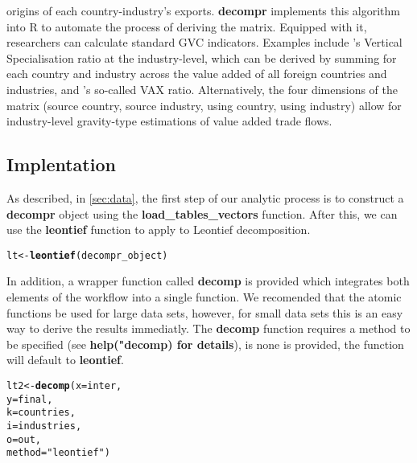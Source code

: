\documentclass[a4paper]{article}\usepackage[]{graphicx}\usepackage[]{color}
\makeatletter
\newcommand{\hlstr}[1]{\textcolor[rgb]{0.192,0.494,0.8}{#1}}%
\newcommand{\hlstd}[1]{\textcolor[rgb]{0.345,0.345,0.345}{#1}}%
\newcommand{\hlkwb}[1]{\textcolor[rgb]{0.69,0.353,0.396}{#1}}%
\newcommand{\hlkwc}[1]{\textcolor[rgb]{0.333,0.667,0.333}{#1}}%
\newcommand{\hlkwd}[1]{\textcolor[rgb]{0.737,0.353,0.396}{\textbf{#1}}}%
\newenvironment{kframe}{%
 \def\at@end@of@kframe{}%
 \ifinner\ifhmode%
  \def\at@end@of@kframe{\end{minipage}}%
  \begin{minipage}{\columnwidth}%
 \fi\fi%
 \def\FrameCommand##1{\hskip\@totalleftmargin \hskip-\fboxsep
 \colorbox{shadecolor}{##1}\hskip-\fboxsep
     \hskip-\linewidth \hskip-\@totalleftmargin \hskip\columnwidth}%
 \MakeFramed {\advance\hsize-\width
   \@totalleftmargin\z@ \linewidth\hsize
   \@setminipage}}%
 {\par\unskip\endMakeFramed%
 \at@end@of@kframe}
\newenvironment{knitrout}{}{} %
\makeatother
\begin{document}
origins of each country-industry's exports.
\textbf{decompr} implements this algorithm into R to automate the process of deriving the matrix. 
Equipped with it, researchers can calculate standard GVC indicators.
Examples include \citet{dahuetal01}'s Vertical Specialisation ratio at the industry-level, 
which can be derived by summing for each country and industry across the value added of all foreign countries and industries,
and \citet{rojoguno12}'s so-called VAX ratio.
Alternatively, the four dimensions of the matrix (source country, source industry, using country, using industry) allow for industry-level gravity-type estimations of value added trade flows.

\subsection{Implentation}
As described, in \cref{sec:data}, the first step of our analytic process is to construct a \textbf{decompr} object using the \textbf{load\_tables\_vectors} function. After this, we can use the \textbf{leontief} function to apply to Leontief decomposition.
\begin{knitrout}
\color{fgcolor}\begin{kframe}
\begin{alltt}
\hlstd{lt} \hlkwb{<-} \hlkwd{leontief}\hlstd{( decompr_object )}
\end{alltt}
\end{kframe}
\end{knitrout}

In addition, a wrapper function called \textbf{decomp} is provided which integrates both elements of the workflow into a single function.
We recomended that the atomic functions be used for large data sets, however, for small data sets this is an easy way to derive the results immediatly.
The \textbf{decomp} function requires a method to be specified (see \textbf{help("decomp) for details}), is none is provided, the function will default to \textbf{leontief}.

\begin{knitrout}
\color{fgcolor}\begin{kframe}
\begin{alltt}
\hlstd{lt2} \hlkwb{<-} \hlkwd{decomp}\hlstd{(} \hlkwc{x} \hlstd{= inter,}
               \hlkwc{y} \hlstd{= final,}
               \hlkwc{k} \hlstd{= countries,}
               \hlkwc{i} \hlstd{= industries,}
               \hlkwc{o} \hlstd{= out,}
               \hlkwc{method} \hlstd{=} \hlstr{"leontief"} \hlstd{)}
\end{alltt}
\end{kframe}
\end{knitrout}
\end{document}
